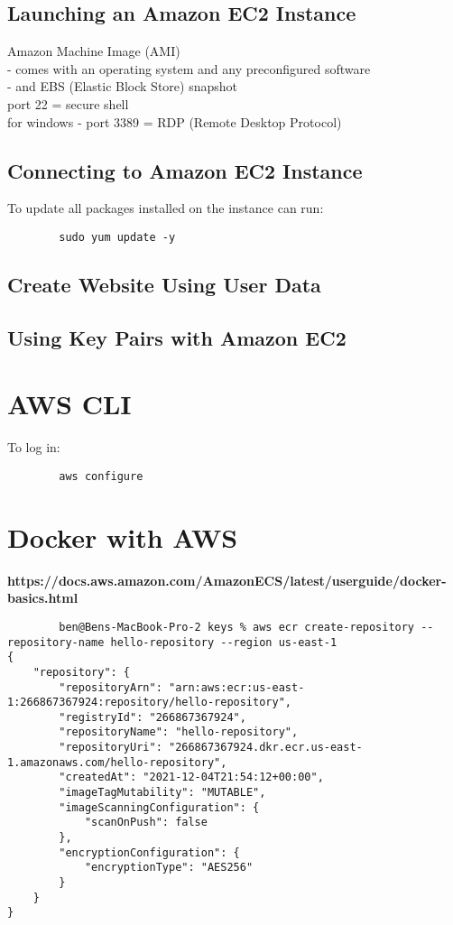 \documentclass[11pt]{article}
\begin{document}
    \subsection{Launching an Amazon EC2 Instance}
    Amazon Machine Image (AMI)
    \\
    - comes with an operating system and any preconfigured software
    \\
    - and EBS (Elastic Block Store) snapshot
    \\
    port 22 = secure shell
    \\
    for windows - port 3389 = RDP (Remote Desktop Protocol)

    \subsection{Connecting to Amazon EC2 Instance}


    To update all packages installed on the instance can run:
    \begin{lstlisting}
        sudo yum update -y
    \end{lstlisting}

    \subsection{Create Website Using User Data}

    \subsection{Using Key Pairs with Amazon EC2}

    \section{AWS CLI}
    To log in:
    \begin{lstlisting}
        aws configure
    \end{lstlisting}


    \section{Docker with AWS}
    \textbf{https://docs.aws.amazon.com/AmazonECS/latest/userguide/docker-basics.html}

    \begin{lstlisting}
        ben@Bens-MacBook-Pro-2 keys % aws ecr create-repository --repository-name hello-repository --region us-east-1
{
    "repository": {
        "repositoryArn": "arn:aws:ecr:us-east-1:266867367924:repository/hello-repository",
        "registryId": "266867367924",
        "repositoryName": "hello-repository",
        "repositoryUri": "266867367924.dkr.ecr.us-east-1.amazonaws.com/hello-repository",
        "createdAt": "2021-12-04T21:54:12+00:00",
        "imageTagMutability": "MUTABLE",
        "imageScanningConfiguration": {
            "scanOnPush": false
        },
        "encryptionConfiguration": {
            "encryptionType": "AES256"
        }
    }
}
    \end{lstlisting}
\end{document}
